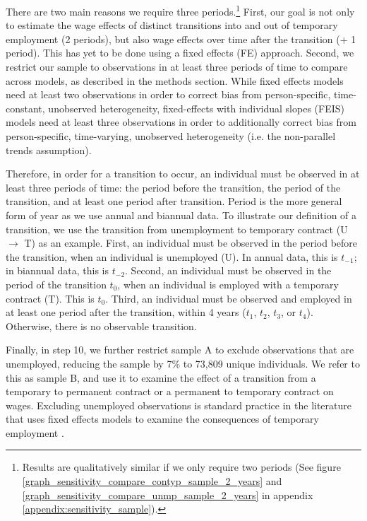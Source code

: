 \documentclass[12pt]{article}
\begin{document}
There are two main reasons we require three periods.\footnote{Results are qualitatively similar if we only require two periods  (See figure \ref{graph_sensitivity_compare_contyp_sample_2_years} and \ref{graph_sensitivity_compare_unmp_sample_2_years} in appendix \ref{appendix:sensitivity_sample}).}  First, our goal is not only to estimate the wage effects of distinct transitions into and out of temporary employment (2 periods), but also wage effects over time after the transition (+ 1 period).  This has yet to be done using a fixed effects (FE) approach.  Second, we restrict our sample to observations in at least three periods of time to compare across models, as described in the methods section.  While fixed effects models need at least two observations in order to correct bias from person-specific, time-constant, unobserved heterogeneity, fixed-effects with individual slopes (FEIS) models need at least three observations in order to additionally correct bias from person-specific, time-varying, unobserved heterogeneity (i.e. the non-parallel trends assumption).  

Therefore, in order for a transition to occur, an individual must be observed in at least three periods of time: the period before the transition, the period of the transition, and at least one period after transition.  Period is the more general form of year as we use annual and biannual data.  To illustrate our definition of a transition, we use the transition from unemployment to temporary contract (U $\rightarrow$ T) as an example.  First, an individual must be observed in the period before the transition, when an individual is unemployed (U).  In annual data, this is $t_{-1}$; in biannual data, this is $t_{-2}$.  Second, an individual must be observed in the period of the transition $t_{0}$, when an individual is employed with a temporary contract (T).  This is $t_{0}$.  Third, an individual must be observed and employed in at least one period after the transition, within 4 years ($t_{1}$, $t_{2}$, $t_{3}$, or $t_{4}$).   Otherwise, there is no observable transition.  

Finally, in step 10, we further restrict sample A to exclude observations that are unemployed, reducing the sample by 7\% to 73,809 unique individuals.  We refer to this as sample B, and use it to examine the effect of a transition from a temporary to permanent contract or a permanent to temporary contract on wages.  Excluding unemployed observations is standard practice in the literature that uses fixed effects models to examine the consequences of temporary employment \citep{barbieri_dual_2018,booth_temporary_2002,gebel_is_2013}.  
\end{document}
